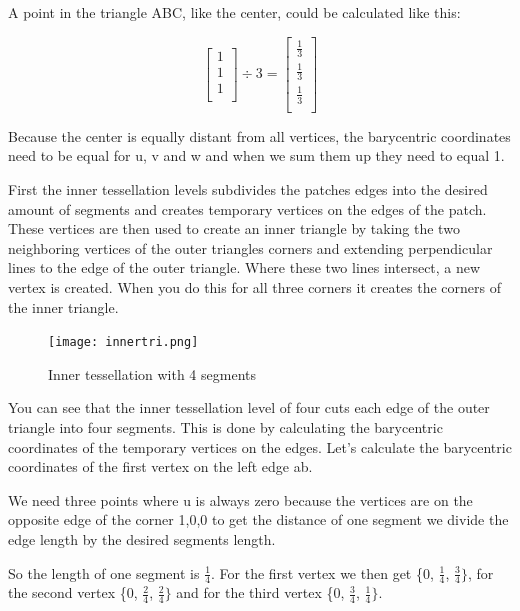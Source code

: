 \documentclass[12pt]{report} \usepackage{preamble}
\begin{document}
A point in the triangle ABC, like the center, could be calculated like this:

\[
	\begin{bmatrix}
		1 \\
		1 \\
		1 \\
	\end{bmatrix}
	\div
	3
	=
	\begin{bmatrix}
		\frac{1}{3} \\
		\frac{1}{3} \\
		\frac{1}{3} \\
	\end{bmatrix}
\]

Because the center is equally distant from all vertices,
the barycentric coordinates need to be equal for u, v and w
and when we sum them up they need to equal 1.

First the inner tessellation levels subdivides the patches edges into the desired amount of segments and
creates temporary vertices on the edges of the patch. These vertices are then used to create an
inner triangle by taking the two neighboring vertices of the outer triangles corners and extending perpendicular
lines to the edge of the outer triangle. Where these two lines intersect, a new vertex is created. When you
do this for all three corners it creates the corners of the inner triangle. \cite{tessellation}

\begin{figure}[hbtp]
	\centering \texttt{[image: innertri.png]}
	\caption{Inner tessellation with 4 segments}
	\cite{fig:inner-tessellation}
\end{figure} \Floatbarrier

You can see that the inner tessellation level of four cuts each edge of the outer triangle into four segments.
This is done by calculating the barycentric coordinates of the temporary vertices on the edges. Let's
calculate the barycentric coordinates of the first vertex on the left edge ab.

We need three points where u is always zero because the vertices are on the opposite edge of the corner {1,0,0}
to get the distance of one segment we divide the edge length by the desired segments length.

So the length of one segment is \(\frac{1}{4}\).
For the first vertex we then get \{0, \(\frac{1}{4}\), \(\frac{3}{4}\}\), for the second
vertex \{0, \(\frac{2}{4}\), \(\frac{2}{4}\}\) and for the third vertex \{0, \(\frac{3}{4}\), \(\frac{1}{4}\}\).
\end{document}
